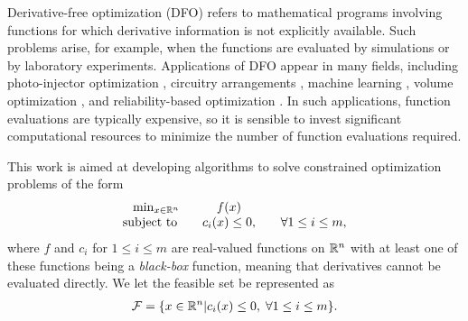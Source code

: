 

Derivative-free optimization (DFO) refers to mathematical programs involving functions for which derivative information is not explicitly available.
Such problems arise, for example, when the functions are evaluated by simulations or by laboratory experiments.
Applications of DFO appear in many fields, including photo-injector optimization \cite{Neveu2017},
circuitry arrangements \cite{PLOSKAS201816}, machine learning \cite{KS2018}, volume optimization \cite{Cheng2017}, and reliability-based optimization \cite{Gao2017}.
In such applications, function evaluations are typically expensive, 
so it is sensible to invest significant computational resources to minimize the number of function evaluations required.

This work is aimed at developing algorithms to solve constrained optimization problems of the form 
\begin{align}
\begin{array}{ccl} \min_{x \in \mathbb R^n} & f(x) \\
\mbox{subject to} \quad & c_i(x) \le 0, &\quad \forall 1 \le i \le m,
\end{array}
\label{the_dfo_problem}
\end{align}
where 
$f$ and $c_i$ for $1 \le i \le m$ are real-valued functions on $\mathbb R^n$ with at least one of these functions being a {\em black-box} function, meaning that derivatives cannot be evaluated directly.
We let the feasible set be represented as
\begin{align}
{\mathcal F} = \{x \in \mathbb R^n | c_i(x) \le 0, \; \forall 1 \le i \le m \}.
\end{align}

